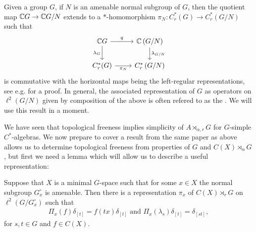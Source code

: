 \begin{remark}
	Given a group $G$, if $N$ is an amenable normal subgroup of $G$, then the quotient map $\mathbb{C} G \to \mathbb{C} G/N$ extends to a $*$-homomorphism $\pi_N \colon C_r^*(G) \to C_r^*\left( G/N \right)$ such that
\begin{equation}
	\begin{tikzcd}
		\C G \ar[r,"q"] \ar[d,"\lambda_G"'] & \C\left( G/N \right) \ar[d, "\lambda_{G/N}"]\\
		C_r^*(G) \ar[r,"\pi_N"'] & C_r^*\left( G/N \right)
	\end{tikzcd}
\end{equation}
is commutative with the horizontal maps being the left-regular representations, see e.g. \cite[Proposition 3]{de2007simplicity} for a proof. In general, the associated representation of $G$ as operators on $\ell^2(G/N)$ given by composition of the above is often refered to as the . We will use this result in a moment.
\end{remark}
We have seen that topological freeness implies simplicity of $A \rtimes_{\alpha,r} G$ for $G$-simple $C^*$-algebras. We now prepare to cover a result from the same paper as above allows us to determine topological freeness from properties of $G$ and $C(X)\rtimes_\alpha G$, but first we need a lemma which will allow us to describe a useful representation:
\begin{lemma}
	Suppose that $X$ is a minimal $G$-space such that for some $x \in X$ the normal subgroup $G_x^\circ$ is amenable. Then there is a representation $\pi_x$ of $C(X) \rtimes_r G$ on $\ell^2(G/G_x^\circ)$ such that
	\begin{align*}
		\Pi_x(f)\delta_{[t]} = f(tx)\delta_{[t]} \text{  and  } \Pi_x(\lambda_s)\delta_{[t]} = \delta_{[st]},
	\end{align*}
	for $s,t \in G$ and $f \in C(X)$.
	\label{CXGrep}
\end{lemma}
